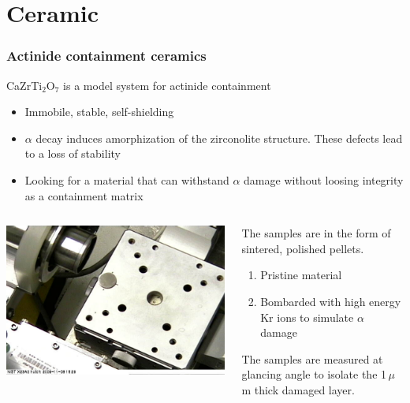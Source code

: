 \documentclass[10pt, xcolor=x11names, compress]{beamer}
\begin{document}
\section{Ceramic}
\begin{frame}
  \frametitle{Actinide containment ceramics}
  
  CaZrTi$_2$O$_7$ is a model system for actinide containment
  \begin{itemize}
  \item Immobile, stable, self-shielding
  \item $\alpha$ decay induces amorphization of the zirconolite
    structure.  These defects lead to a loss of stability
  \item Looking for a material that can withstand $\alpha$ damage
    without loosing integrity as a containment matrix
  \end{itemize}

  \begin{columns}
    \begin{column}{0.4\linewidth}
      \includegraphics[width=\linewidth]{images/tilt_stage.jpg}
    \end{column}
    \begin{column}{0.6\linewidth}
      The samples are in the form of sintered, \alert{polished}
      pellets.
      \begin{enumerate}
      \item Pristine material
      \item Bombarded with high energy Kr ions to simulate $\alpha$
        damage
      \end{enumerate}
      The samples are measured at glancing angle to isolate the
      1\,$\mu$m thick damaged layer.
    \end{column}
  \end{columns}
\end{frame}
\end{document}
